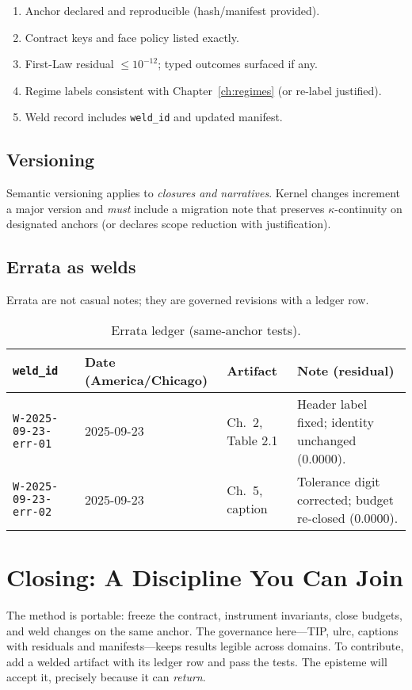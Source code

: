 \begin{eqbox}
\small
\begin{enumerate}[leftmargin=1.25em]
  \item Anchor declared and reproducible (hash/manifest provided).
  \item Contract keys and face policy listed exactly.
  \item First-Law residual \(\le 10^{-12}\); typed outcomes surfaced if any.
  \item Regime labels consistent with Chapter~\ref{ch:regimes} (or re-label justified).
  \item Weld record includes \texttt{weld\_id} and updated manifest.
\end{enumerate}
\end{eqbox}

\subsection*{Versioning}
Semantic versioning applies to \emph{closures and narratives}. Kernel changes increment a major version and \emph{must} include a migration note that preserves \(\kappa\)-continuity on designated anchors (or declares scope reduction with justification).

\subsection*{Errata as welds}
Errata are not casual notes; they are governed revisions with a ledger row.

\begin{table}[h]
  \centering
  \caption{Errata ledger (same-anchor tests).}
  \label{tab:errata}
  \footnotesize
  \begingroup
  \setlength{\tabcolsep}{4pt}
  \begin{tabularx}{\linewidth}{@{} l l l >{\raggedright\arraybackslash}X @{}}
    \toprule
    \texttt{weld\_id} & Date (America/Chicago) & Artifact & Note (residual) \\
    \midrule
    \texttt{W-2025-09-23-err-01} & 2025-09-23 & Ch.~2, Table 2.1 & Header label fixed; identity unchanged (0.0000). \\
    \texttt{W-2025-09-23-err-02} & 2025-09-23 & Ch.~5, caption   & Tolerance digit corrected; budget re-closed (0.0000). \\
    \bottomrule
  \end{tabularx}
  \endgroup
\end{table}

\section{Closing: A Discipline You Can Join}
\label{sec:closing}

The method is portable: freeze the contract, instrument invariants, close budgets, and weld changes on the same anchor. The governance here—TIP, \gls{ulrc}, captions with residuals and manifests—keeps results legible across domains. To contribute, add a welded artifact with its ledger row and pass the tests. The episteme will accept it, precisely because it can \emph{return}.
